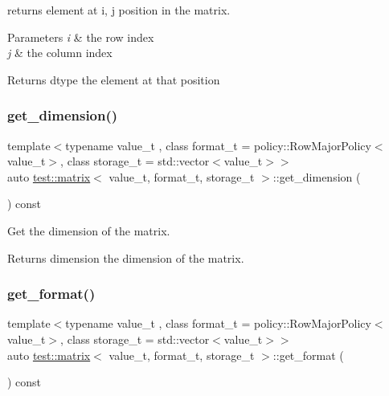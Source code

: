 returns element at i, j position in the matrix. 


\begin{DoxyParams}{Parameters}
{\em i} & the row index \\
\hline
{\em j} & the column index \\
\hline
\end{DoxyParams}
\begin{DoxyReturn}{Returns}
dtype the element at that position 
\end{DoxyReturn}
\mbox{\label{classtest_1_1matrix_ad441a590a304dabb40950e5dfaee698a}} 
\subsubsection{\texorpdfstring{get\_dimension()}{get\_dimension()}}
{\footnotesize\ttfamily template$<$typename value\+\_\+t , class format\+\_\+t  = policy\+::\+Row\+Major\+Policy$<$value\+\_\+t$>$, class storage\+\_\+t  = std\+::vector$<$value\+\_\+t$>$$>$ \\
auto \mbox{\hyperlink{classtest_1_1matrix}{test\+::matrix}}$<$ value\+\_\+t, format\+\_\+t, storage\+\_\+t $>$\+::get\+\_\+dimension (\begin{DoxyParamCaption}{ }\end{DoxyParamCaption}) const\hspace{0.3cm}{\ttfamily [inline]}}



Get the dimension of the matrix. 

\begin{DoxyReturn}{Returns}
dimension the dimension of the matrix. 
\end{DoxyReturn}
\mbox{\label{classtest_1_1matrix_a8ae828048f36dc401ec79755c782a204}} 
\subsubsection{\texorpdfstring{get\_format()}{get\_format()}}
{\footnotesize\ttfamily template$<$typename value\+\_\+t , class format\+\_\+t  = policy\+::\+Row\+Major\+Policy$<$value\+\_\+t$>$, class storage\+\_\+t  = std\+::vector$<$value\+\_\+t$>$$>$ \\
auto \mbox{\hyperlink{classtest_1_1matrix}{test\+::matrix}}$<$ value\+\_\+t, format\+\_\+t, storage\+\_\+t $>$\+::get\+\_\+format (\begin{DoxyParamCaption}{ }\end{DoxyParamCaption}) const\hspace{0.3cm}{\ttfamily [inline]}}



